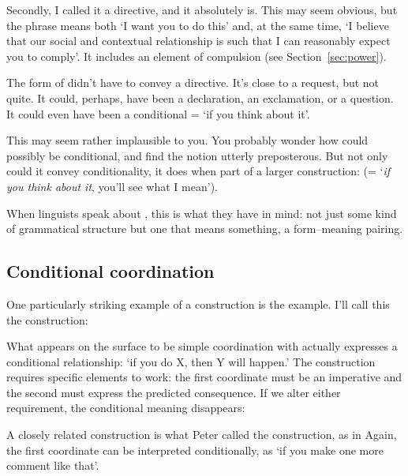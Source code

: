 Secondly, I called it a directive, and it absolutely is. This may seem obvious, but the phrase means both `I want you to do this' and, at the same time, `I believe that our social and contextual relationship is such that I can reasonably expect you to comply'. It includes an element of compulsion (see Section~\ref{sec:power}).

The form of  didn't have to convey a directive. It's close to a request, but not quite. It could, perhaps, have been a declaration, an exclamation, or a question. It could even have been a conditional = `if you think about it'.

This may seem rather implausible to you. You probably wonder how  could possibly be conditional, and find the notion utterly preposterous. But not only could it convey conditionality, it does when part of a larger construction:  (= `\emph{if you think about it}, you'll see what I mean').

When linguists speak about , this is what they have in mind: not just some kind of grammatical structure but one that means something, a form--meaning pairing.

\subsection{Conditional coordination}\label{sec:conditional-coordination}

One particularly striking example of a construction is the  example. I'll call this the  construction:

\ea\label{ex:conditional-coord}
   \z
\z
What appears on the surface to be simple coordination with  actually expresses a conditional relationship: `if you do X, then Y will happen.' The construction requires specific elements to work: the first coordinate must be an imperative and the second must express the predicted consequence. If we alter either requirement, the conditional meaning disappears:

\ea\label{ex:conditional-coord-constraints}
   \z
\z
A closely related construction is what Peter \citet{culicover1970one} called the  construction, as in  Again, the first coordinate can be interpreted conditionally, as `if you make one more comment like that'.

